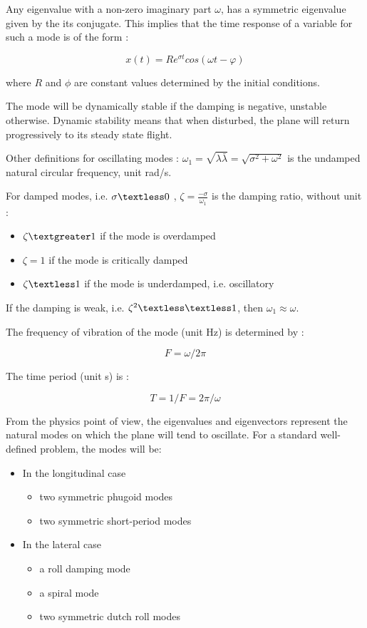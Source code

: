 \documentclass[a4paper,twoside,12pt,dvips]{article}
\begin{document}
Any eigenvalue with a non-zero imaginary part $\omega$, has a
symmetric eigenvalue given by the its conjugate. This implies that the
time response of a variable for such a mode is of the form :

$$x(t) = R e^{\sigma t} cos(\omega t - \varphi)$$

where $R$ and $\phi$ are constant values determined by the initial
conditions.

The mode will be dynamically stable if the damping is negative,
unstable otherwise. Dynamic stability means that when disturbed, the
plane will return progressively to its steady state flight.

Other definitions for oscillating modes : $ \omega_1=\sqrt{\lambda
\bar{\lambda}}=\sqrt{\sigma^2 + \omega^2}$ is the undamped natural
circular frequency, unit rad/s.

For damped modes, i.e. $ \sigma \textless 0$ , $\zeta =
\frac{-\sigma}{\omega_1}$ is the damping ratio, without unit :

\begin{itemize}
\item $\zeta \textgreater 1$ if the mode is overdamped
\item $\zeta = 1$ if the mode is critically damped
\item $\zeta \textless 1$ if the mode is underdamped, i.e.
oscillatory
\end{itemize}

If the damping is weak, i.e. $ \zeta^2 \textless \textless 1$, then $
\omega_1 \approx \omega$.

The frequency of vibration of the mode (unit Hz) is determined by :

$$F = \omega / 2 \pi $$

The time period (unit s) is :

$$T = 1 / F = 2 \pi / \omega $$

From the physics point of view, the eigenvalues and eigenvectors
represent the natural modes on which the plane will tend to oscillate.
For a standard well-defined problem, the modes will be:

\begin{itemize}
\item In the longitudinal case
\begin{itemize}
\item two symmetric phugoid modes
\item two symmetric short-period modes
\end{itemize}
\item In the lateral case
\begin{itemize}
\item a roll damping mode
\item a spiral mode
\item two symmetric dutch roll modes
\end{itemize}
\end{itemize}
\end{document}
